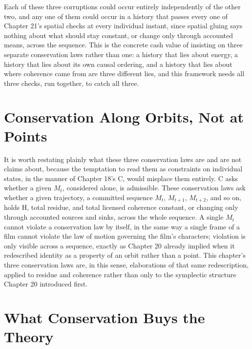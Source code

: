 Each of these three corruptions could occur entirely independently of the other two, and any one of them could occur in a history that passes every one of Chapter 21's spatial checks at every individual instant, since spatial gluing says nothing about what should stay constant, or change only through accounted means, across the sequence. This is the concrete cash value of insisting on three separate conservation laws rather than one: a history that lies about energy, a history that lies about its own causal ordering, and a history that lies about where coherence came from are three different lies, and this framework needs all three checks, run together, to catch all three.

\section{Conservation Along Orbits, Not at Points}

It is worth restating plainly what these three conservation laws are and are not claims about, because the temptation to read them as constraints on individual states, in the manner of Chapter 18's C, would misplace them entirely. C asks whether a given \(M_t\), considered alone, is admissible. These conservation laws ask whether a given trajectory, a committed sequence \(M_t\), \(M_{t+1}\), \(M_{t+2}\), and so on, holds H, total residue, and total licensed coherence constant, or changing only through accounted sources and sinks, across the whole sequence. A single \(M_t\) cannot violate a conservation law by itself, in the same way a single frame of a film cannot violate the law of motion governing the film's characters; violation is only visible across a sequence, exactly as Chapter 20 already implied when it redescribed identity as a property of an orbit rather than a point. This chapter's three conservation laws are, in this sense, elaborations of that same redescription, applied to residue and coherence rather than only to the symplectic structure Chapter 20 introduced first.

\section{What Conservation Buys the Theory}

